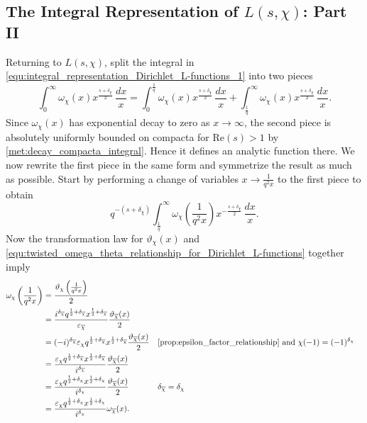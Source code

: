\documentclass[12pt]{book}
\theoremstyle{definition}\newframedtheorem{method}{Method}
\renewcommand{\d}{\delta}
\newcommand{\w}{\omega}
\newcommand{\e}{\varepsilon}
\newcommand{\vt}{\vartheta}
\newcommand{\<}{\langle}
\renewcommand{\>}{\rangle}
\newcommand{\conj}{\overline}
\newcommand{\cchi}{\conj{\chi}}
\renewcommand{\Re}{\mathrm{Re}}
\begin{document}
    \subsection*{The Integral Representation of \texorpdfstring{$L(s,\chi)$}{L(s,x)}: Part II}
      Returning to $L(s,\chi)$, split the integral in \cref{equ:integral_representation_Dirichlet_L-functions_1} into two pieces
      \begin{equation}\label{equ:symmetric_integral_Dirichlet_L-functions_split}
        \int_{0}^{\infty}\w_{\chi}(x)x^{\frac{s+\d_{\chi}}{2}}\,\frac{dx}{x} = \int_{0}^{\frac{1}{q}}\w_{\chi}(x)x^{\frac{s+\d_{\chi}}{2}}\,\frac{dx}{x}+\int_{\frac{1}{q}}^{\infty}\w_{\chi}(x)x^{\frac{s+\d_{\chi}}{2}}\,\frac{dx}{x}.
      \end{equation}
      Since $\w_{\chi}(x)$ has exponential decay to zero as $x \to \infty$, the second piece is absolutely uniformly bounded on compacta for $\Re(s) > 1$ by \cref{met:decay_compacta_integral}. Hence it defines an analytic function there. We now rewrite the first piece in the same form and symmetrize the result as much as possible. Start by performing a change of variables $x \to \frac{1}{q^{2}x}$ to the first piece to obtain
      \[
        q^{-(s+\d_{\chi})}\int_{\frac{1}{q}}^{\infty}\w_{\chi}\left(\frac{1}{q^{2}x}\right)x^{-\frac{s+\d_{\chi}}{2}}\,\frac{dx}{x}.
      \]
      Now the transformation law for $\vt_{\chi}(x)$ and \cref{equ:twisted_omega_theta_relationship_for_Dirichlet_L-functions} together imply
      \begin{align*}
        \w_{\chi}\left(\frac{1}{q^{2}x}\right) &= \frac{\vt_{\chi}\left(\frac{1}{q^{2}x}\right)}{2} \\
        &= \frac{i^{\d_{\cchi}}q^{\frac{1}{2}+\d_{\cchi}}x^{\frac{1}{2}+\d_{\cchi}}}{\e_{\cchi}}\frac{\vt_{\cchi}(x)}{2} \\
        &= (-i)^{\d_{\cchi}}\e_{\chi}q^{\frac{1}{2}+\d_{\cchi}}x^{\frac{1}{2}+\d_{\cchi}}\frac{\vt_{\cchi}(x)}{2} && \text{\cref{prop:epsilon_factor_relationship} and $\chi(-1) = (-1)^{\d_{\chi}}$} \\
        &= \frac{\e_{\chi}q^{\frac{1}{2}+\d_{\cchi}}x^{\frac{1}{2}+\d_{\cchi}}}{i^{\d_{\cchi}}}\frac{\vt_{\cchi}(x)}{2} \\
        &= \frac{\e_{\chi}q^{\frac{1}{2}+\d_{\chi}}x^{\frac{1}{2}+\d_{\chi}}}{i^{\d_{\chi}}}\frac{\vt_{\cchi}(x)}{2} && \text{$\d_{\cchi} = \d_{\chi}$} \\
        &= \frac{\e_{\chi}q^{\frac{1}{2}+\d_{\chi}}x^{\frac{1}{2}+\d_{\chi}}}{i^{\d_{\chi}}}\w_{\cchi}(x).
      \end{align*}
\end{document}
